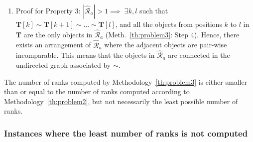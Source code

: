\documentclass[acmsmall,screen, review]{acmart}
\begin{document}
\begin{enumerate}
	\item Proof for Property 3: $|\mathcal{\hat{R}}_a| > 1 \implies $   $\exists k,l$ such that $\mathbf{T}[k] \sim \mathbf{T}[k+1] \sim \dots \sim  \mathbf{T}[l]$, and all the objects from positions $k$ to $l$ in $\mathbf{T}$ are  the only objects in $\mathcal{\hat{R}}_a$ (Meth.~\ref{th:problem3}: Step 4). 
	Hence,  there exists an arrangement of $\mathcal{\hat{R}}_a$ where the adjacent objects are pair-wise incomparable. This means that the objects in $\mathcal{\hat{R}}_a$ are connected in the undirected graph associated by $\sim$. 
\end{enumerate}

The number of ranks computed by Methodology~\ref{th:problem3} is either smaller than or equal to the number of ranks computed according to Methodology~\ref{th:problem2}, but not necessarily the least possible number of ranks.

\subsubsection{Instances where the least number of ranks is not computed}
\end{document}
